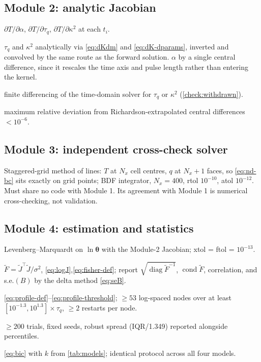 \documentclass[11pt,a4paper]{article}
\theoremstyle{definition}
\newcommand{\tq}{\tau_{q}}
\newcommand{\kk}{\kappa^{2}}
\newcommand{\Bnum}{B}
\begin{document}
\subsection{Module 2: analytic Jacobian}

\begin{description}[nosep,style=nextline]
\item[Outputs] $\partial T/\partial\alpha$, $\partial T/\partial\tq$,
  $\partial T/\partial\kk$ at each $t_{i}$.
\item[Method] $\tq$ and $\kk$ analytically via \eqref{eq:dKdm} and
  \eqref{eq:dK-dparams}, inverted and convolved by the same route as the
  forward solution. $\alpha$ by a single central difference, since it rescales
  the time axis and pulse length rather than entering the kernel.
\item[Prohibited] finite differencing of the time-domain solver for $\tq$ or
  $\kk$ (\cref{check:withdrawn}).
\item[Acceptance] maximum relative deviation from Richardson-extrapolated
  central differences $<10^{-6}$.
\end{description}

\subsection{Module 3: independent cross-check solver}

Staggered-grid method of lines: $T$ at $N_{x}$ cell centres, $q$ at $N_{x}+1$
faces, so \eqref{eq:nd-bc} sits exactly on grid points; BDF integrator,
$N_{x}=400$, rtol $10^{-10}$, atol $10^{-12}$. Must share no code with
Module 1. Its agreement with Module 1 is numerical cross-checking, not
validation.

\subsection{Module 4: estimation and statistics}

\begin{description}[nosep,style=nextline]
\item[Estimator] Levenberg--Marquardt on $\ln\bm{\theta}$ with the Module-2
  Jacobian; xtol = ftol = $10^{-13}$.
\item[Fisher] $\tilde F=\tilde J^{\!\top}\tilde J/\sigma^{2}$,
  \eqref{eq:logJ},\eqref{eq:fisher-def}; report
  $\sqrt{\operatorname{diag}\tilde F^{-1}}$, $\operatorname{cond}\tilde F$,
  correlation, and s.e.$(\Bnum)$ by the delta method \eqref{eq:seB}.
\item[Profile likelihood] \eqref{eq:profile-def}--\eqref{eq:profile-threshold};
  $\geq53$ log-spaced nodes over at least $[10^{-1.3},10^{1.3}]\times\tq$,
  $\geq2$ restarts per node.
\item[Monte Carlo] $\geq200$ trials, fixed seeds, robust spread
  (IQR/1.349) reported alongside percentiles.
\item[BIC] \eqref{eq:bic} with $k$ from \cref{tab:models}; identical protocol
  across all four models.
\end{description}
\end{document}
